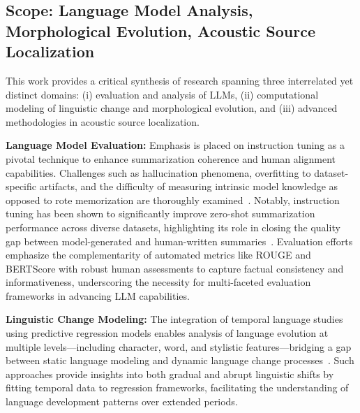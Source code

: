 \documentclass[sigconf]{acmart}
\begin{document}
\subsection{Scope: Language Model Analysis, Morphological Evolution, Acoustic Source Localization}

This work provides a critical synthesis of research spanning three interrelated yet distinct domains: (i) evaluation and analysis of LLMs, (ii) computational modeling of linguistic change and morphological evolution, and (iii) advanced methodologies in acoustic source localization.

\textbf{Language Model Evaluation:} Emphasis is placed on instruction tuning as a pivotal technique to enhance summarization coherence and human alignment capabilities. Challenges such as hallucination phenomena, overfitting to dataset-specific artifacts, and the difficulty of measuring intrinsic model knowledge as opposed to rote memorization are thoroughly examined~\cite{ref10,ref51,ref52}. Notably, instruction tuning has been shown to significantly improve zero-shot summarization performance across diverse datasets, highlighting its role in closing the quality gap between model-generated and human-written summaries~\cite{ref1}. Evaluation efforts emphasize the complementarity of automated metrics like ROUGE and BERTScore with robust human assessments to capture factual consistency and informativeness, underscoring the necessity for multi-faceted evaluation frameworks in advancing LLM capabilities.

\textbf{Linguistic Change Modeling:} The integration of temporal language studies using predictive regression models enables analysis of language evolution at multiple levels—including character, word, and stylistic features—bridging a gap between static language modeling and dynamic language change processes~\cite{ref41}. Such approaches provide insights into both gradual and abrupt linguistic shifts by fitting temporal data to regression frameworks, facilitating the understanding of language development patterns over extended periods.
\end{document}
